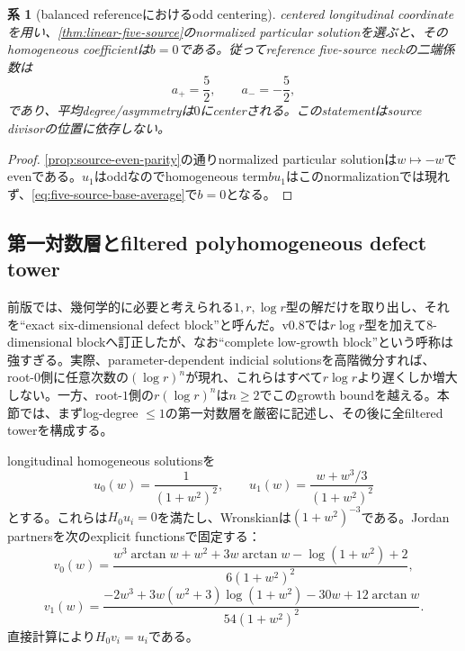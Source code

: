 \documentclass[11pt,a4paper]{ltjsarticle}
\newtheorem{corollary}[theorem]{系}
\theoremstyle{definition}
\theoremstyle{remark}
\begin{document}
\begin{corollary}[balanced referenceにおけるodd centering]\label{cor:balanced-odd-centering}
centered longitudinal coordinateを用い、\cref{thm:linear-five-source}のnormalized particular solutionを選ぶと、そのhomogeneous coefficientは$b=0$である。従ってreference five-source neckの二端係数は
\[
 a_+=\frac52,\qquad a_-=-\frac52,
\]
であり、平均degree/asymmetryは$0$にcenterされる。このstatementはsource divisorの位置に依存しない。
\end{corollary}

\begin{proof}
\cref{prop:source-even-parity}の通りnormalized particular solutionは$w\mapsto-w$でevenである。$u_1$はoddなのでhomogeneous term$b u_1$はこのnormalizationでは現れず、\eqref{eq:five-source-base-average}で$b=0$となる。
\end{proof}


\subsection{第一対数層とfiltered polyhomogeneous defect tower}
\label{subsec:corrected-defect-block}

前版では、幾何学的に必要と考えられる$1,r,\log r$型の解だけを取り出し、それを``exact six-dimensional defect block''と呼んだ。v0.8では$r\log r$型を加えて8-dimensional blockへ訂正したが、なお``complete low-growth block''という呼称は強すぎる。実際、parameter-dependent indicial solutionsを高階微分すれば、root-$0$側に任意次数の$(\log r)^n$が現れ、これらはすべて$r\log r$より遅くしか増大しない。一方、root-$1$側の$r(\log r)^n$は$n\ge2$でこのgrowth boundを越える。本節では、まずlog-degree $\le1$の第一対数層を厳密に記述し、その後に全filtered towerを構成する。

longitudinal homogeneous solutionsを
\begin{equation}\label{eq:longitudinal-zero-modes}
 u_0(w)=\frac1{(1+w^2)^2},
 \qquad
 u_1(w)=\frac{w+w^3/3}{(1+w^2)^2}
\end{equation}
とする。これらは$H_0u_i=0$を満たし、Wronskianは$(1+w^2)^{-3}$である。Jordan partnersを次のexplicit functionsで固定する：
\begin{equation}\label{eq:jordan-v0}
 v_0(w)=
 \frac{w^3\arctan w+w^2+3w\arctan w-\log(1+w^2)+2}
 {6(1+w^2)^2},
\end{equation}
\begin{equation}\label{eq:jordan-v1}
 v_1(w)=
 \frac{-2w^3+3w(w^2+3)\log(1+w^2)-30w+12\arctan w}
 {54(1+w^2)^2}.
\end{equation}
直接計算により$H_0v_i=u_i$である。
\end{document}
